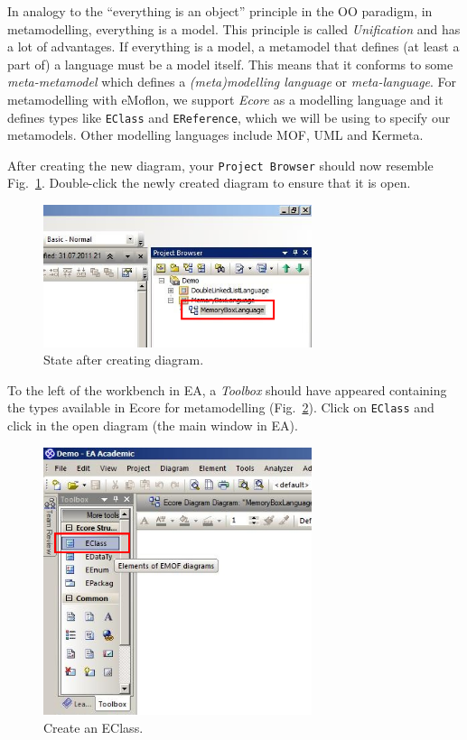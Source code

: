 In analogy to the ``everything is an object''
principle in the OO paradigm, in metamodelling, everything is a model.
This principle is called \emph{Unification} and has a lot of advantages.
If everything is a model, a metamodel that defines (at least a part of) a
language must be a model itself.
This means that it conforms to some \emph{meta-metamodel} which defines a
\emph{(meta)modelling language} or \emph{meta-language}.
For metamodelling with eMoflon, we support \emph{Ecore} as a modelling language
and it defines types like \texttt{EClass} and \texttt{EReference}, which we will
be using to specify  our metamodels.
Other modelling languages include MOF, UML and Kermeta. 

\clearpage

After creating the new diagram, your  \texttt{Project Browser} should now
resemble Fig.~\ref{fig:diagram_completed}.  Double-click the newly
created diagram to ensure that it is open.

\begin{figure}[htbp]
	\centering
  \includegraphics[width=0.7\textwidth]{pics/memBox06.png}
	\caption{State after creating diagram.}
	\label{fig:diagram_completed}
\end{figure}

To the left of the workbench in EA, a \emph{Toolbox} should have appeared
containing the types available in Ecore for metamodelling
(Fig.~\ref{fig:eclass}).  Click on \texttt{EClass} and click in the open
diagram (the main window in EA).

\begin{figure}[htbp]
	\centering
  \includegraphics[width=0.7\textwidth]{pics/memBox07.png}
	\caption{Create an EClass.}
	\label{fig:eclass}
\end{figure}

